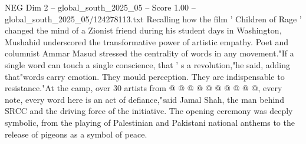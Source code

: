 \begin{textsample}{NEG Dim 2 – global\_south\_2025\_05 – Score 1.00 – global\_south\_2025\_05/124278113.txt}
Recalling how the film ' Children of Rage ' changed the mind of a Zionist friend during his student days in Washington, Mushahid underscored the transformative power of artistic empathy.
Poet and columnist Ammar Masud stressed the centrality of words in any movement."If a single word can touch a single conscience, that ' s a revolution,"he said, adding that"words carry emotion.
They mould perception.
They are indispensable to resistance."At the camp, over 30 artists from @ @ @ @ @ @ @ @ @ @, every note, every word here is an act of defiance,"said Jamal Shah, the man behind SRCC and the driving force of the initiative.
The opening ceremony was deeply symbolic, from the playing of Palestinian and Pakistani national anthems to the release of pigeons as a symbol of peace.

\end{textsample}
